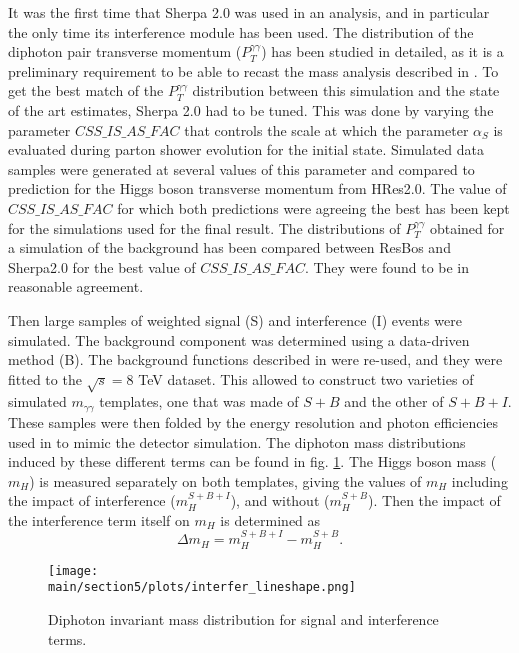 It was the first time that Sherpa 2.0 was used in an analysis, and in particular the only time its interference module has been used. The distribution of the diphoton pair transverse momentum ($P_T^{\gamma\gamma}$) has been studied in detailed, as it is a preliminary requirement to be able to recast the mass analysis described in \cite{Aad:2014aba}. To get the best match of the $P_T^{\gamma\gamma}$ distribution between this simulation and the state of the art estimates, Sherpa 2.0 had to be tuned. This was done by varying the parameter $CSS\_IS\_AS\_FAC$ that controls the scale at which the parameter $\alpha_S$ is evaluated during parton shower evolution for the initial state. Simulated data samples were generated at several values of this parameter and compared to prediction for the Higgs boson transverse momentum from HRes2.0. The value of $CSS\_IS\_AS\_FAC$ for which both predictions were agreeing the best has been kept for the simulations used for the final result. The distributions of $P_T^{\gamma\gamma}$ obtained for a simulation of the background has been compared between ResBos and Sherpa2.0 for the best value of $CSS\_IS\_AS\_FAC$. They were found to be in reasonable agreement.

Then large samples of weighted signal (S) and interference (I) events were simulated. The background component was determined using a data-driven method (B). The background functions described in \cite{Aad:2014aba} were re-used, and they were fitted to the $\sqrt{s} = 8$ TeV dataset. This allowed to construct two varieties of simulated $m_{\gamma\gamma}$ templates, one that was made of $S+B$ and the other of $S+B+I$. These samples were then folded by the energy resolution and photon efficiencies used in \cite{Aad:2014aba} to mimic the detector simulation. The diphoton mass distributions induced by these different terms can be found in fig. \ref{fig:interfer_lineshape}. The Higgs boson mass ($m_H$) is measured separately on both templates, giving the values of $m_H$ including the impact of interference ($m_H^{S+B+I}$), and without ($m_H^{S+B}$). Then the impact of the interference term itself on $m_H$ is determined as \begin{equation}
    \Delta m_H = m_H^{S+B+I}-m_H^{S+B}.
\end{equation}

\begin{figure}
    \centering
    \texttt{[image: \\main/section5/plots/interfer\_lineshape.png]}
    \caption{Diphoton invariant mass distribution for signal and interference terms.}
    \label{fig:interfer_lineshape}
\end{figure}

